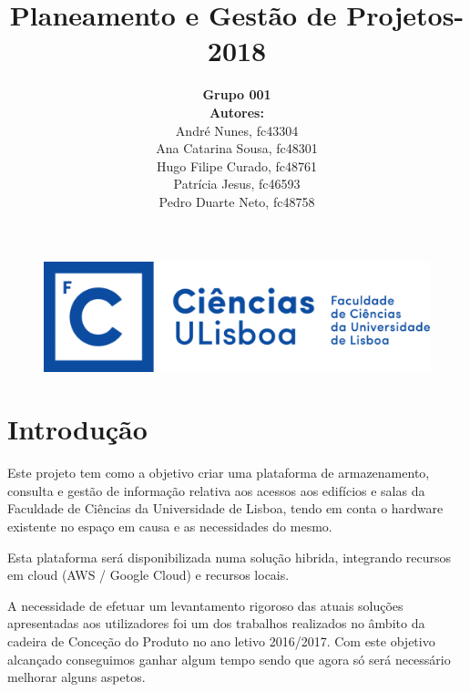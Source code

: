 \documentclass[a4paper]{report}
\begin{document}
\title{\textbf{Planeamento e Gestão de Projetos}\linebreak {}-2018\linebreak {}}
\date{}
\author{
	\textbf{Grupo 001}\\
	\textbf{Autores:}\\
	André Nunes, fc43304\\
	Ana Catarina Sousa, fc48301\\ 
	Hugo Filipe Curado, fc48761\\ 
	Patrícia Jesus, fc46593\\
	Pedro Duarte Neto, fc48758
}
\begin{figure}
	\begin{center}
		\includegraphics[scale=.2]{images/LogoFCUL.png}
	\end{center}
\end{figure}
\maketitle
\tableofcontents
\chapter{Introdução}
Este projeto tem como a objetivo criar uma plataforma de armazenamento, consulta e gestão de informação relativa aos acessos aos edifícios e salas da Faculdade de Ciências da Universidade de Lisboa, tendo em conta o hardware existente no espaço em causa e as necessidades do mesmo.

Esta plataforma será disponibilizada numa solução hibrida, integrando recursos em cloud (AWS / Google Cloud) e recursos locais.

A necessidade de efetuar um levantamento rigoroso das atuais soluções apresentadas aos utilizadores foi um dos trabalhos realizados no âmbito da cadeira de Conceção do Produto no ano letivo 2016/2017. Com este objetivo alcançado conseguimos ganhar algum tempo sendo que agora só será necessário melhorar alguns aspetos.
\end{document}
